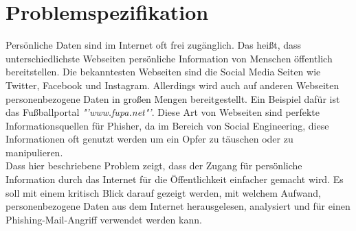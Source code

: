 

\chapter{Problemspezifikation}  %
\label{cha:Problemspezifikation} %
Persönliche Daten sind im Internet oft frei zugänglich. Das heißt, dass unterschiedlichste Webseiten persönliche Information von Menschen öffentlich bereitstellen. Die bekanntesten Webseiten sind die Social Media Seiten wie Twitter, Facebook und Instagram. Allerdings wird auch auf anderen Webseiten personenbezogene Daten in großen Mengen bereitgestellt. Ein Beispiel dafür ist das Fußballportal \textit{"'www.fupa.net"'}. Diese Art von Webseiten sind perfekte Informationsquellen für Phisher, da im Bereich von Social Engineering, diese Informationen oft genutzt werden um ein Opfer zu täuschen oder zu manipulieren.\\
Dass hier beschriebene Problem zeigt, dass der Zugang für persönliche Information durch das Internet für die Öffentlichkeit einfacher gemacht wird. Es soll mit einem kritisch Blick darauf gezeigt werden, mit welchem Aufwand, personenbezogene Daten aus dem Internet herausgelesen, analysiert und für einen Phishing-Mail-Angriff verwendet werden kann.
